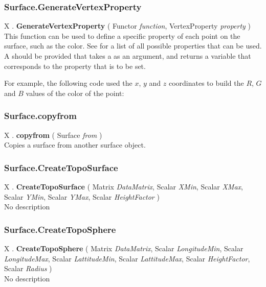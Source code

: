 \subsubsection{Surface.GenerateVertexProperty \label{F:Surface:GenerateVertexProperty}}
X . \textbf{GenerateVertexProperty} ( Functor \textit{function}, VertexProperty \textit{property} ) \\
This function can be used to define a specific property of each point on the surface, such as the color. See  for a list of all possible properties that can be used. A  should be provided that takes a  as an argument, and returns a variable that corresponds to the property that is to be set.

For example, the following code used the $x$, $y$ and $z$ coordinates to build the $R$, $G$ and $B$ values of the color of the point: \\

\subsubsection{Surface.copyfrom \label{F:Surface:copyfrom}}
X . \textbf{copyfrom} ( Surface \textit{from} ) \\
Copies a surface from another surface object.

\subsubsection{Surface.CreateTopoSurface \label{F:Surface:CreateTopoSurface}}
X . \textbf{CreateTopoSurface} ( Matrix \textit{DataMatrix}, Scalar \textit{XMin}, Scalar \textit{XMax}, Scalar \textit{YMin}, Scalar \textit{YMax}, Scalar \textit{HeightFactor} ) \\
No description

\subsubsection{Surface.CreateTopoSphere \label{F:Surface:CreateTopoSphere}}
X . \textbf{CreateTopoSphere} ( Matrix \textit{DataMatrix}, Scalar \textit{LongitudeMin}, Scalar \textit{LongitudeMax}, Scalar \textit{LattitudeMin}, Scalar \textit{LattitudeMax}, Scalar \textit{HeightFactor}, Scalar \textit{Radius} ) \\
No description

